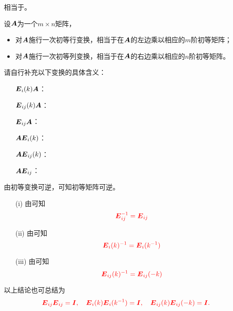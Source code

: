   相当于。
 




%
\begin{dingli}
  设$\boldsymbol{A}$为一个$m\times n$矩阵，
  \begin{itemize}
  \item 
    对$\boldsymbol{A}$施行一次初等行变换，相当于在$\boldsymbol{A}$的左边乘以相应的$m$阶初等矩阵；
  \item
    对$\boldsymbol{A}$施行一次初等列变换，相当于在$\boldsymbol{A}$的右边乘以相应的$n$阶初等矩阵。
  \end{itemize}
\end{dingli}




\begin{lianxi}
  请自行补充以下变换的具体含义：
  \begin{itemize}
  \item[] $\boldsymbol{E}_i(k)\boldsymbol{A}$：
  \item[] $\boldsymbol{E}_{ij}(k)\boldsymbol{A}$：
  \item[] $\boldsymbol{E}_{ij}\boldsymbol{A}$：
  \item[] $\boldsymbol{A}\boldsymbol{E}_i(k)$：
  \item[] $\boldsymbol{A}\boldsymbol{E}_{ij}(k)$：
  \item[] $\boldsymbol{A}\boldsymbol{E}_{ij}$：
  \end{itemize}
\end{lianxi}




由初等变换可逆，可知初等矩阵可逆。  
\begin{itemize}
\item[(i)] 由可知
  $$
  \textcolor{red}{\boldsymbol{E}_{ij}^{-1} = \boldsymbol{E}_{ij}}
  $$ 
\item[(ii)] 由可知
  $$
  \textcolor{red}{\boldsymbol{E}_{i}(k)^{-1} = \boldsymbol{E}_{i}(k^{-1})}
  $$ 
\item[(iii)] 由可知
  $$
  \textcolor{red}{\boldsymbol{E}_{ij}(k)^{-1} = \boldsymbol{E}_{ij}(-k)}
  $$ 
\end{itemize}




以上结论也可总结为
  $$ \textcolor{red}{
    \boldsymbol{E}_{ij}\boldsymbol{E}_{ij}=\boldsymbol{I}, \quad
    \boldsymbol{E}_{i}(k)\boldsymbol{E}_{i}(k^{-1}) = \boldsymbol{I}, \quad
    \boldsymbol{E}_{ij}(k)\boldsymbol{E}_{ij}(-k) = \boldsymbol{I}.
  }
  $$      





